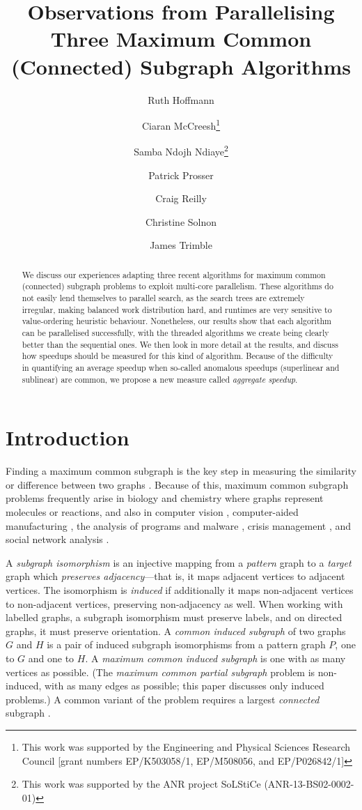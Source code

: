 \documentclass{llncs}
\title{Observations from Parallelising Three Maximum Common (Connected) Subgraph Algorithms}
\author{
    Ruth Hoffmann\inst{1}
    \and Ciaran McCreesh\thanks{This work was supported by the Engineering and Physical Sciences
        Research Council [grant numbers EP/K503058/1, EP/M508056, and EP/P026842/1]}\inst{2}
    \and Samba Ndojh Ndiaye\thanks{This work
    was supported by the ANR project SoLStiCe (ANR-13-BS02-0002-01)}\inst{3}
    \and Patrick Prosser\samethanks[1]\inst{2}
    \and Craig Reilly\samethanks[1]\inst{2}
    \and Christine Solnon\samethanks[2]\inst{4}
    \and James Trimble\samethanks[1]\inst{2}}
\institute{
    University of St Andrews, St Andrews, United Kingdom \and
    University of Glasgow, Glasgow, Scotland \and
    Universit\'e Lyon 1, LIRIS, UMR5205, F-69621, France
    \and INSA-Lyon, LIRIS, UMR5205, F-69621, France}
\begin{document}
\maketitle

\begin{abstract}
    We discuss our experiences adapting three recent algorithms for maximum common (connected)
    subgraph problems to exploit multi-core parallelism. These algorithms do not easily lend
    themselves to parallel search, as the search trees are extremely irregular, making balanced work
    distribution hard, and runtimes are very sensitive to value-ordering heuristic behaviour.
    Nonetheless, our results show that each algorithm can be parallelised successfully, with the
    threaded algorithms we create being clearly better than the sequential ones. We then look in
    more detail at the results, and discuss how speedups should be measured for this kind of
    algorithm.  Because of the difficulty in quantifying an average speedup when so-called anomalous
    speedups (superlinear and sublinear) are common, we propose a new measure called \emph{aggregate
    speedup}.
\end{abstract}

\section{Introduction}

Finding a maximum common subgraph is the key step in measuring the similarity or difference between
two graphs \cite{DBLP:journals/prl/Bunke97,DBLP:journals/prl/FernandezV01,o:Kriege15}.  Because of
this, maximum common subgraph problems frequently arise in biology and chemistry
\cite{DBLP:journals/jcamd/RaymondW02a,o:EhrlichR11,DBLP:journals/dam/GayFMSS14} where graphs
represent molecules or reactions, and also in computer vision
\cite{DBLP:journals/jair/CookH94,DBLP:conf/gbrpr/CombierDS13}, computer-aided manufacturing
\cite{o:LuoWSN17}, the analysis of programs and malware
\cite{DBLP:conf/icics/GaoRS08,DBLP:journals/compsec/ParkRS13}, crisis management
\cite{o:DelavalladeFLL16}, and social network analysis \cite{DBLP:journals/tkde/FangYZZ15}.

A \emph{subgraph isomorphism} is an injective mapping from a \emph{pattern} graph to a \emph{target}
graph which \emph{preserves adjacency}---that is, it maps adjacent vertices to adjacent vertices.
The isomorphism is \emph{induced} if additionally it maps non-adjacent vertices to non-adjacent
vertices, preserving non-adjacency as well. When working with labelled graphs, a subgraph
isomorphism must preserve labels, and on directed graphs, it must preserve orientation. A
\emph{common induced subgraph} of two graphs $G$ and $H$ is a pair of induced subgraph isomorphisms
from a pattern graph $P$, one to $G$ and one to $H$. A \emph{maximum common induced subgraph} is one
with as many vertices as possible. (The \emph{maximum common partial subgraph} problem is
non-induced, with as many edges as possible; this paper discusses only induced problems.) A common
variant of the problem requires a largest \emph{connected} subgraph
\cite{DBLP:journals/jcamd/RaymondW02a,DBLP:conf/mco/VismaraV08,o:EhrlichR11,o:LuoWSN17}.
\end{document}
